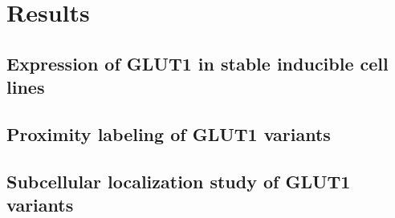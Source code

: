 
\chapter{Results} %
\label{Chapter3} %
\section{Expression of GLUT1 in stable inducible cell lines}

\section{Proximity labeling of GLUT1 variants}

\section{Subcellular localization study of GLUT1 variants}

